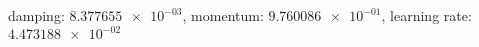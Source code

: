damping: $\num[scientific-notation=true]{8.377655e-03}$, momentum: $\num[scientific-notation=true]{9.760086e-01}$, learning rate: $\num[scientific-notation=true]{4.473188e-02}$